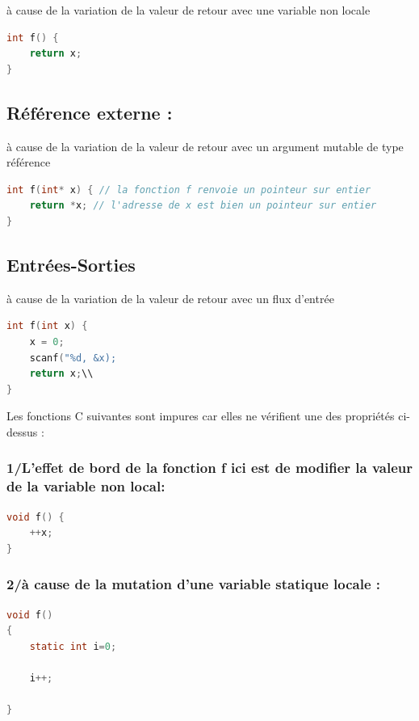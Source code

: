 \documentclass[12pt,titlepage]{article}
\begin{document}
à cause de la variation de la valeur de retour avec une variable non locale

\begin{lstlisting}[language=c]
int f() {
    return x;
}
\end{lstlisting}

\subsection{Référence externe :}

à cause de la variation de la valeur de retour avec un argument mutable de type référence

\begin{lstlisting}[language=c]
int f(int* x) { // la fonction f renvoie un pointeur sur entier
    return *x; // l'adresse de x est bien un pointeur sur entier
}
\end{lstlisting}

\subsection{Entrées-Sorties}

à cause de la variation de la valeur de retour avec un flux d'entrée

\begin{lstlisting}[language=c]
int f(int x) {
    x = 0;
    scanf("%d, &x);
    return x;\\
}
\end{lstlisting}

Les fonctions C suivantes sont impures car elles ne vérifient une des propriétés ci-dessus :

\subsubsection{1/L'effet de bord de la fonction f ici est de modifier la valeur de la variable non local:}

\begin{lstlisting}[language=c]
void f() {
    ++x;
}
\end{lstlisting}

\subsubsection{ 2/à cause de la mutation d'une variable statique locale :}

\begin{lstlisting}[language=c]
void f()
{
    static int i=0; 

    i++;
    
}
\end{lstlisting}
\end{document}
